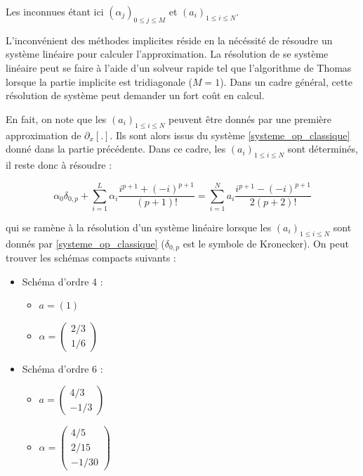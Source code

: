 \documentclass[10pt,a4paper]{amsart}
\begin{document}
Les inconnues étant ici $\left( \alpha_j \right)_{0 \leq j \leq M}$ et $\left( a_i \right)_{1 \leq i \leq N}$.

L'inconvénient des méthodes implicites réside en la nécéssité de résoudre un système linéaire pour calculer l'approximation. La résolution de se système linéaire peut se faire à l'aide d'un solveur rapide tel que l'algorithme de Thomas lorsque la partie implicite est tridiagonale ($M=1$). Dans un cadre général, cette résolution de système peut demander un fort coût en calcul.

En fait, on note que les $\left(a_i\right)_{1 \leq i \leq N}$ peuvent être donnés par une première approximation de $\partial_x \left[ . \right]$. Ils sont alors issus du système \eqref{systeme_op_classique} donné dans la partie précédente. Dans ce cadre, les $\left(a_i\right)_{1 \leq i \leq N}$ sont déterminés, il reste donc à résoudre :

\begin{equation}
\alpha_0 \delta_{0,p} + \sum_{i=1}^{L} \alpha_i \dfrac{i^{p+1} + (-i)^{p+1}}{(p+1)!} = \sum_{i=1}^{N} a_i \dfrac{i^{p+1} - (-i)^{p+1}}{2(p+2)!}
\end{equation}

qui se ramène à la résolution d'un système linéaire lorsque les $(a_i)_{1 \leq i  \leq N}$ sont donnés par \eqref{systeme_op_classique} ($\delta_{0,p}$ est le symbole de Kronecker).
On peut trouver les schémas compacts suivants :

\begin{itemize}
\item Schéma d'ordre 4 :
\begin{itemize}
\item $a = \left( 1 \right)$\\
\item $\alpha = \begin{pmatrix}
2/3 \\ 1/6
\end{pmatrix}$
\end{itemize}

\item Schéma d'ordre 6 :
\begin{itemize}
\item $a = \begin{pmatrix}
4/3 \\ -1/3
\end{pmatrix}$\\
\item $\alpha = \begin{pmatrix}
4/5 \\ 2/15 \\ -1/30
\end{pmatrix}$
\end{itemize}
\end{itemize}
\end{document}
